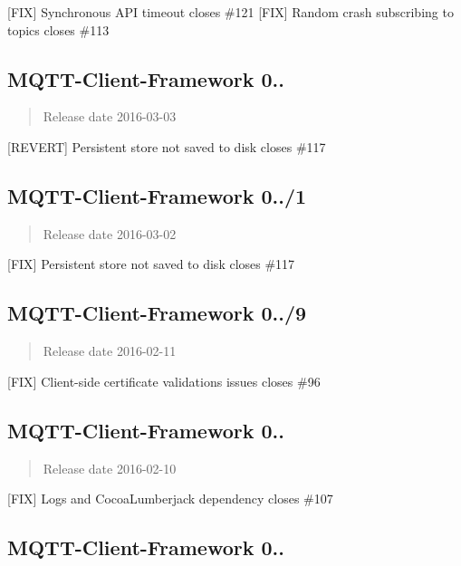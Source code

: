 \mbox{[}F\+IX\mbox{]} Synchronous A\+PI timeout closes \#121 \mbox{[}F\+IX\mbox{]} Random crash subscribing to topics closes \#113

\subsection*{M\+Q\+T\+T-\/\+Client-\/\+Framework 0..}

\begin{quote}
Release date 2016-\/03-\/03 \end{quote}


\mbox{[}R\+E\+V\+E\+RT\mbox{]} Persistent store not saved to disk closes \#117

\subsection*{M\+Q\+T\+T-\/\+Client-\/\+Framework 0../1}

\begin{quote}
Release date 2016-\/03-\/02 \end{quote}


\mbox{[}F\+IX\mbox{]} Persistent store not saved to disk closes \#117

\subsection*{M\+Q\+T\+T-\/\+Client-\/\+Framework 0../9}

\begin{quote}
Release date 2016-\/02-\/11 \end{quote}


\mbox{[}F\+IX\mbox{]} Client-\/side certificate validations issues closes \#96

\subsection*{M\+Q\+T\+T-\/\+Client-\/\+Framework 0..}

\begin{quote}
Release date 2016-\/02-\/10 \end{quote}


\mbox{[}F\+IX\mbox{]} Logs and Cocoa\+Lumberjack dependency closes \#107

\subsection*{M\+Q\+T\+T-\/\+Client-\/\+Framework 0..}

